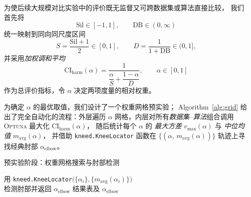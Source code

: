 \documentclass[10pt]{article} %
\numberwithin{equation}{section}
\begin{document}
\textcolor[rgb]{0.00,0.07,1.00}{为使后续大规模对比实验中的评价既无监督又可跨数据集或算法直接比较，
我们首先将
\[
\text{Sil}\in[-1,1],\qquad 
\text{DB}\in(0,\infty)
\]
统一映射到同向同尺度区间
\[
S=\frac{\text{Sil}+1}{2}\in[0,1],\qquad 
D=\frac{1}{1+\text{DB}}\in(0,1],
\]
并采用\emph{加权调和平均}
\[
\text{CI}_{\mathrm{harm}}(\alpha)=
\frac{1}{\dfrac{\alpha}{S}+\dfrac{1-\alpha}{D}},\qquad 
\alpha\in[0,1]
\]
作为总评价指标，令 $\alpha$ 决定两项度量的相对权重。}

\textcolor[rgb]{0.00,0.07,1.00}{为确定 $\alpha$ 的最优取值，我们设计了一个权重网格预实验；
Algorithm \ref{alg:grid} 给出了完全自动化的流程：外层遍历
$\alpha$ 网格，内层对所有\emph{数据集--算法}组合调用
\textsc{Optuna} 最大化 $\text{CI}_{\mathrm{harm}}(\alpha)$，
随后统计每个 $\alpha$ 的
\emph{最大方差} $v_{\max}(\alpha)$ 与 \emph{中位均值} $m_{\mathrm{avg}}(\alpha)$，
并借助 \texttt{kneed.KneeLocator} 函数在
$\bigl\{(\alpha,\,m_{\mathrm{avg}}(\alpha))\bigr\}$ 轨迹上寻找经典肘部
$\alpha_{\text{elbow}}$。}

\begin{algorithm}[t]
\small
\setlength{\tabcolsep}{6pt}
\renewcommand{\arraystretch}{1.2}
\caption{\textcolor[rgb]{0.00,0.07,1.00}{预实验阶段：权重网格搜索与肘部检测}}
\label{alg:grid}

用 \texttt{kneed.KneeLocator}$\bigl(\{\alpha_i\},\{m_{\mathrm{avg}}(\alpha_i)\}\bigr)$\\
检测肘部并返回 $\alpha_{\text{elbow}}$\;
\KwRet 结果表及 $\alpha_{\text{elbow}}$
\end{algorithm}
\end{document}
